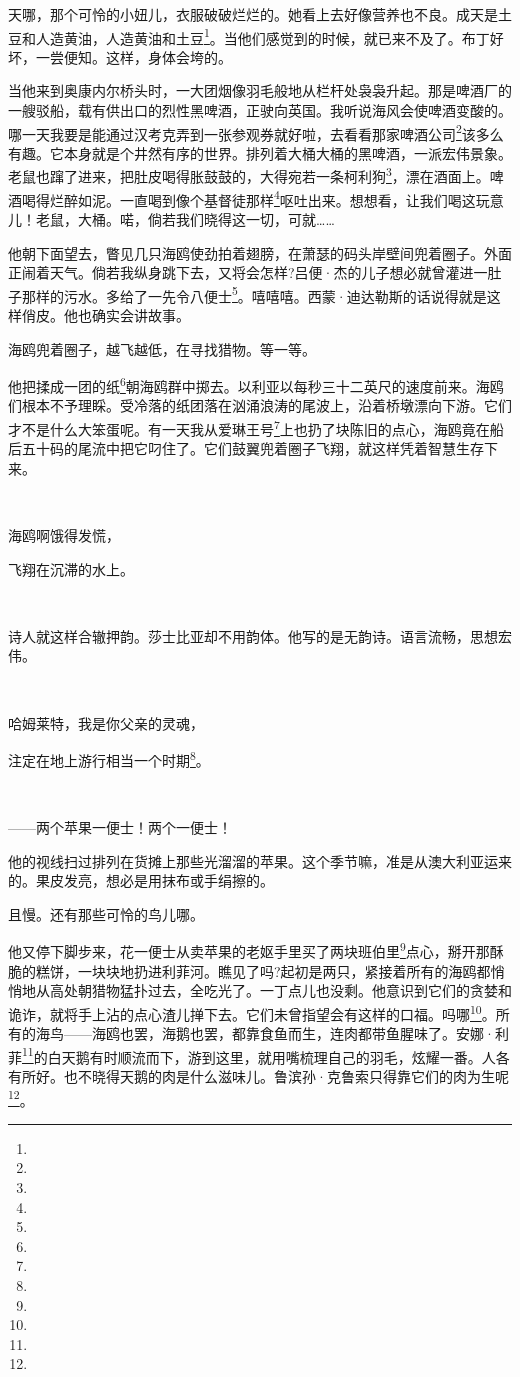 \par 天哪，那个可怜的小妞儿，衣服破破烂烂的。她看上去好像营养也不良。成天是土豆和人造黄油，人造黄油和土豆\footnote{}。当他们感觉到的时候，就已来不及了。布丁好坏，一尝便知。这样，身体会垮的。
\par 当他来到奥康内尔桥头时，一大团烟像羽毛般地从栏杆处袅袅升起。那是啤酒厂的一艘驳船，载有供出口的烈性黑啤酒，正驶向英国。我听说海风会使啤酒变酸的。哪一天我要是能通过汉考克弄到一张参观券就好啦，去看看那家啤酒公司\footnote{}该多么有趣。它本身就是个井然有序的世界。排列着大桶大桶的黑啤酒，一派宏伟景象。老鼠也蹿了进来，把肚皮喝得胀鼓鼓的，大得宛若一条柯利狗\footnote{}，漂在酒面上。啤酒喝得烂醉如泥。一直喝到像个基督徒那样\footnote{}呕吐出来。想想看，让我们喝这玩意儿！老鼠，大桶。喏，倘若我们晓得这一切，可就……
\par 他朝下面望去，瞥见几只海鸥使劲拍着翅膀，在萧瑟的码头岸壁间兜着圈子。外面正闹着天气。倘若我纵身跳下去，又将会怎样?吕便·杰的儿子想必就曾灌进一肚子那样的污水。多给了一先令八便士\footnote{}。嘻嘻嘻。西蒙·迪达勒斯的话说得就是这样俏皮。他也确实会讲故事。
\par 海鸥兜着圈子，越飞越低，在寻找猎物。等一等。
\par 他把揉成一团的纸\footnote{}朝海鸥群中掷去。以利亚以每秒三十二英尺的速度前来。海鸥们根本不予理睬。受冷落的纸团落在汹涌浪涛的尾波上，沿着桥墩漂向下游。它们才不是什么大笨蛋呢。有一天我从爱琳王号\footnote{}上也扔了块陈旧的点心，海鸥竟在船后五十码的尾流中把它叼住了。它们鼓翼兜着圈子飞翔，就这样凭着智慧生存下来。
\par  
\par 海鸥啊饿得发慌，
\par 飞翔在沉滞的水上。
\par  
\par 诗人就这样合辙押韵。莎士比亚却不用韵体。他写的是无韵诗。语言流畅，思想宏伟。
\par  
\par 哈姆莱特，我是你父亲的灵魂，
\par 注定在地上游行相当一个时期\footnote{}。
\par  
\par ——两个苹果一便士！两个一便士！
\par 他的视线扫过排列在货摊上那些光溜溜的苹果。这个季节嘛，准是从澳大利亚运来的。果皮发亮，想必是用抹布或手绢擦的。
\par 且慢。还有那些可怜的鸟儿哪。
\par 他又停下脚步来，花一便士从卖苹果的老妪手里买了两块班伯里\footnote{}点心，掰开那酥脆的糕饼，一块块地扔进利菲河。瞧见了吗?起初是两只，紧接着所有的海鸥都悄悄地从高处朝猎物猛扑过去，全吃光了。一丁点儿也没剩。他意识到它们的贪婪和诡诈，就将手上沾的点心渣儿掸下去。它们未曾指望会有这样的口福。吗哪\footnote{}。所有的海鸟——海鸥也罢，海鹅也罢，都靠食鱼而生，连肉都带鱼腥味了。安娜·利菲\footnote{}的白天鹅有时顺流而下，游到这里，就用嘴梳理自己的羽毛，炫耀一番。人各有所好。也不晓得天鹅的肉是什么滋味儿。鲁滨孙·克鲁索只得靠它们的肉为生呢\footnote{}。

